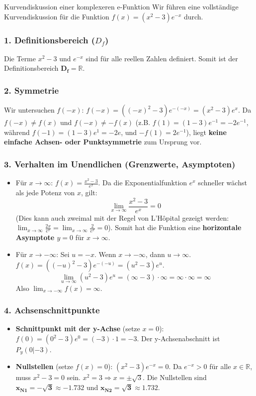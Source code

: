 \begin{loesungsumgebung}{Kurvendiskussion einer komplexeren e-Funktion}
Wir führen eine vollständige Kurvendiskussion für die Funktion $f(x) = (x^2 - 3)e^{-x}$ durch.

\subsubsection*{1. Definitionsbereich ($D_f$)}
Die Terme $x^2-3$ und $e^{-x}$ sind für alle reellen Zahlen definiert.
Somit ist der Definitionsbereich $\mathbf{D_f = \mathbb{R}}$.

\subsubsection*{2. Symmetrie}
Wir untersuchen $f(-x)$:
$f(-x) = ((-x)^2 - 3)e^{-(-x)} = (x^2 - 3)e^x$.
Da $f(-x) \neq f(x)$ und $f(-x) \neq -f(x)$ (z.B. $f(1) = (1-3)e^{-1} = -2e^{-1}$, während $f(-1) = (1-3)e^1 = -2e$, und $-f(1) = 2e^{-1}$), liegt \textbf{keine einfache Achsen- oder Punktsymmetrie} zum Ursprung vor.

\subsubsection*{3. Verhalten im Unendlichen (Grenzwerte, Asymptoten)}
\begin{itemize}
    \item Für $x \to \infty$:
    $f(x) = \frac{x^2 - 3}{e^x}$. Da die Exponentialfunktion $e^x$ schneller wächst als jede Potenz von $x$, gilt:
    $$ \lim_{x \to \infty} \frac{x^2 - 3}{e^x} = 0 $$
    (Dies kann auch zweimal mit der Regel von L'Hôpital gezeigt werden: $\lim_{x \to \infty} \frac{2x}{e^x} = \lim_{x \to \infty} \frac{2}{e^x} = 0$).
    Somit hat die Funktion eine \textbf{horizontale Asymptote $y=0$} für $x \to \infty$.
    \item Für $x \to -\infty$:
    Sei $u = -x$. Wenn $x \to -\infty$, dann $u \to \infty$.
    $f(x) = ((-u)^2 - 3)e^{-(-u)} = (u^2 - 3)e^u$.
    $$ \lim_{u \to \infty} (u^2 - 3)e^u = (\infty - 3) \cdot \infty = \infty \cdot \infty = \infty $$
    Also $\lim_{x \to -\infty} f(x) = \mathbf{\infty}$.
\end{itemize}

\subsubsection*{4. Achsenschnittpunkte}
\begin{itemize}
    \item \textbf{Schnittpunkt mit der y-Achse} (setze $x=0$):
    $f(0) = (0^2 - 3)e^0 = (-3) \cdot 1 = -3$.
    Der y-Achsenabschnitt ist $P_y(0|-3)$.
    \item \textbf{Nullstellen} (setze $f(x)=0$):
    $(x^2 - 3)e^{-x} = 0$.
    Da $e^{-x} > 0$ für alle $x \in \mathbb{R}$, muss $x^2 - 3 = 0$ sein.
    $x^2 = 3 \Rightarrow x = \pm\sqrt{3}$.
    Die Nullstellen sind $\mathbf{x_{N1} = -\sqrt{3} \approx -1.732}$ und $\mathbf{x_{N2} = \sqrt{3} \approx 1.732}$.
\end{itemize}


\end{loesungsumgebung}
